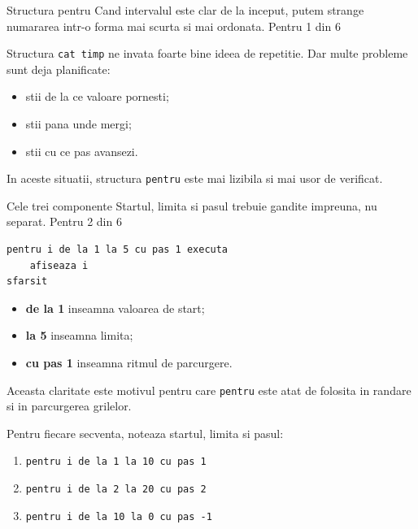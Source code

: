 \PageHeader
  {Structura pentru}
  {Cand intervalul este clar de la inceput, putem strange numararea intr-o forma mai scurta si mai ordonata.}
  {Pentru 1 din 6}

\begin{missionbox}
Structura \texttt{cat timp} ne invata foarte bine ideea de repetitie. Dar multe probleme sunt deja planificate:
\begin{itemize}
\item stii de la ce valoare pornesti;
\item stii pana unde mergi;
\item stii cu ce pas avansezi.
\end{itemize}

In aceste situatii, structura \texttt{pentru} este mai lizibila si mai usor de verificat.
\end{missionbox}


\clearpage

\PageHeader
  {Cele trei componente}
  {Startul, limita si pasul trebuie gandite impreuna, nu separat.}
  {Pentru 2 din 6}

\begin{examplebox}
\begin{lstlisting}[style=codequest]
pentru i de la 1 la 5 cu pas 1 executa
    afiseaza i
sfarsit
\end{lstlisting}
\end{examplebox}

\begin{conceptbox}
\begin{itemize}
\item \textbf{de la 1} inseamna valoarea de start;
\item \textbf{la 5} inseamna limita;
\item \textbf{cu pas 1} inseamna ritmul de parcurgere.
\end{itemize}
Aceasta claritate este motivul pentru care \texttt{pentru} este atat de folosita in randare si in parcurgerea grilelor.
\end{conceptbox}

\begin{guidebox}[Identificare]
Pentru fiecare secventa, noteaza startul, limita si pasul:
\begin{enumerate}
\item \texttt{pentru i de la 1 la 10 cu pas 1}
\item \texttt{pentru i de la 2 la 20 cu pas 2}
\item \texttt{pentru i de la 10 la 0 cu pas -1}
\end{enumerate}
\end{guidebox}

